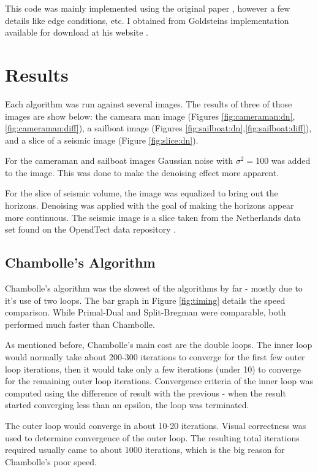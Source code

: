 \documentclass[11pt]{article}
\begin{document}
This code was mainly implemented using the original paper \cite{goldstein2009split}, however a few details like edge conditions, etc. I obtained from Goldsteins implementation available for download at his website \cite{goldsteinImplementation}.

\section{Results}

Each algorithm was run against several images.  
The results of three of those images are show below: the cameara man image (Figures \ref{fig:cameraman:dn},\ref{fig:cameraman:diff}), a sailboat image (Figures \ref{fig:sailboat:dn},\ref{fig:sailboat:diff}), and a slice of a seismic image (Figure \ref{fig:slice:dn}).

For the cameraman and sailboat images Gaussian noise with $\sigma^2=100$ was added to the image.
This was done to make the denoising effect more apparent.

For the slice of seismic volume, the image was equalized to bring out the horizons.
Denoising was applied with the goal of making the horizons appear more continuous.
The seismic image is a slice taken from the Netherlands data set found on the OpendTect data repository \cite{opendTectWeb}.

\subsection{Chambolle's Algorithm}

Chambolle's algorithm was the slowest of the algorithms by far - mostly due to it's use of two loops.  
The bar graph in Figure \ref{fig:timing} details the speed comparison.
While Primal-Dual and Split-Bregman were comparable, both performed much faster than Chambolle.

As mentioned before, Chambolle's main cost are the double loops.
The inner loop would normally take about 200-300 iterations to converge for the first few outer loop iterations, then it would take only a few iterations (under 10) to converge for the remaining outer loop iterations.
Convergence criteria of the inner loop was computed using the difference of result with the previous - when the result started converging less than an epsilon, the loop was terminated.

The outer loop would converge in about 10-20 iterations.
Visual correctness was used to determine convergence of the outer loop.
The resulting total iterations required usually came to about 1000 iterations, which is the big reason for Chambolle's poor speed.
\end{document}
